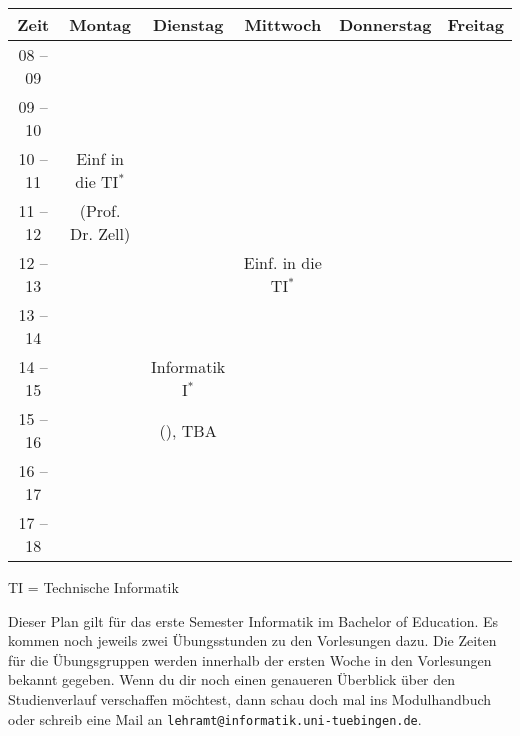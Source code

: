 \begin{minipage}{\textwidth}
    \footnotesize
\begin{center}
	\begin{tabular}{|c|c|c|c|c|c|}
	\hline
	 Zeit     &    Montag                    & Dienstag          & Mittwoch          & Donnerstag & Freitag \\ \hline\hline
	 08 -- 09 &                              &                   &                   &  &  \\ \cline{1-1} \cline{3-3} \cline{5-6} 
	 09 -- 10 &                              &                   &                   &  &  \\ \hline
	 10 -- 11 &    Einf in die TI$^*$            &                   &                   &  &  \\ \cline{1-1} \cline{3-6} 
	 11 -- 12 &    (Prof. Dr. Zell)          &                   &                   &  &  \\ \hline
	 12 -- 13 &                              &                   & Einf. in die TI$^*$   &  &  \\ \hline
	 13 -- 14 &                              &                   &                   &  &  \\ \hline
	 14 -- 15 &                              & Informatik I$^*$      &                   &  &  \\ \cline{1-2} \cline{4-6} 
	 15 -- 16 &                              & (\Infoprof), TBA  &                   &  &  \\ \hline
	 16 -- 17 &                              &                   &                   &  &  \\ \hline
	 17 -- 18 &                              &                   &                   &  &  \\ \hline
	\end{tabular}
	
	\scriptsize TI = Technische Informatik
	
\end{center}
\end{minipage}

Dieser Plan gilt für das erste Semester Informatik im Bachelor of Education. Es kommen noch jeweils zwei Übungsstunden zu den Vorlesungen dazu.
Die Zeiten für die Übungsgruppen werden innerhalb der ersten Woche in den Vorlesungen bekannt gegeben. Wenn du dir noch einen genaueren Überblick über den Studienverlauf verschaffen möchtest, dann schau doch mal ins Modulhandbuch oder schreib eine Mail an \texttt{lehramt@informatik.uni-tuebingen.de}.

